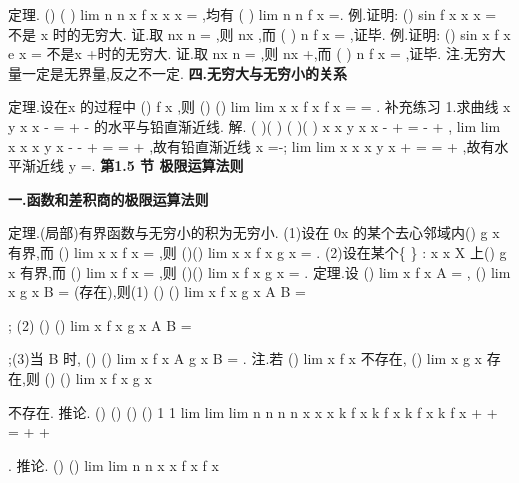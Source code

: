 \textcolor{lyred}{定理}.
()
(
)
lim
n
n
x
f x
x
x
\to 
=\infty \Leftrightarrow \forall 
\to 
\neq 
\Omega 
\Omega 
\Omega ,均有
(
)
lim
n
n
f x
\to \infty 
=\infty . 
\textcolor{lyred}{例}.证明:
()
sin
f x
x
x
=
不是
x \to 
时的无穷大. 
证.取
nx
n\pi 
=
,则
nx \to 
,而
(
)
n
f x
=
,证毕. 
\textcolor{lyred}{例}.证明:
()
sin
x
f x
e
x
=
不是x \to +\infty 时的无穷大. 
证.取
nx
n\pi 
=
,则
nx \to +\infty ,而
(
)
n
f x
=
,证毕. 
\textcolor{lyred}{注}.无穷大量一定是无界量,反之不一定. 
\vspace{4pt}
{\bfseries \textcolor{lyred}{四.无穷大与无穷小的关系}}

\textcolor{lyred}{定理}.设在x \to \Omega 的过程中
()
f x \neq 
,则
()
()
lim
lim
x
x
f x
f x
\to 
\to 
=\infty \Leftrightarrow 
=
\Omega 
\Omega 
. 
\textcolor{lyred}{补充练习 }
1.求曲线
x
y
x
x
-
=
+
-
的水平与铅直渐近线. 
解.
(
)(
)
(
)(
)
x
x
y
x
x
-
+
=
-
+
,
lim
lim
x
x
x
y
x
\to -
\to -
+
=
=\infty 
+
,故有铅直渐近线
x =-; 
lim
lim
x
x
x
y
x
\to \infty 
\to \infty 
+
=
=
+
,故有水平渐近线
y =. 
\vspace{6pt}
{\large \bfseries \textcolor{lyred}{第1.5 节 极限运算法则}}

\vspace{4pt}
{\bfseries \textcolor{lyred}{一.函数和差积商的极限运算法则}}

\textcolor{lyred}{定理}.(局部)有界函数与无穷小的积为无穷小. 
(1)设在
0x 的某个去心邻域内()
g x 有界,而
()
lim
x
x f x
\to 
=
,则
()()
lim
x
x f x g x
\to 
=
. 
(2)设在某个\{
\}
:
x
x
X
\ge 
上()
g x 有界,而
()
lim
x
f x
\to \infty 
=
,则
()()
lim
x
f x g x
\to \infty 
=
. 
\textcolor{lyred}{定理}.设
()
lim
x
f x
A
\to 
=
\Omega 
,
()
lim
x
g x
B
\to 
=
\Omega 
(存在),则(1)
()
()
lim
x
f x
g x
A
B
\to 
\pm 
=
\pm 




\Omega 
; 
(2)
()
()
lim
x
f x
g x
A B
\to 
\cdots 
=
\cdots 




\Omega 
;(3)当
B \neq 
时,
()
()
lim
x
f x
A
g x
B
\to 
=
\Omega 
. 
\textcolor{lyred}{注}.若
()
lim
x
f x
\to \Omega 
不存在,
()
lim
x
g x
\to \Omega 
存在,则
()
()
lim
x
f x
g x
\to 
\pm 




\Omega 
不存在. 
\textcolor{lyred}{推论}.
()
()
()
()
1 1
lim
lim
lim
n
n
n
n
x
x
x
k f
x
k f
x
k
f
x
k
f
x
\to 
\to 
\to 
+
+
=
+
+




\Omega 
\Omega 
\Omega 
\Lambda 
\Lambda 
. 
\textcolor{lyred}{推论}.
()
()
lim
lim
n
n
x
x
f x
f x
\to 
\to 


